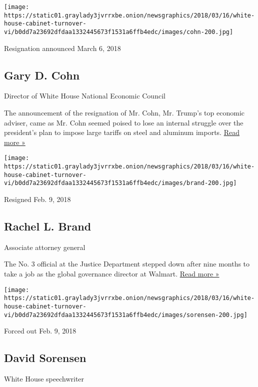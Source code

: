 \texttt{[image: https://static01.graylady3jvrrxbe.onion/newsgraphics/2018/03/16/white-house-cabinet-turnover-vi/b0dd7a23692dfdaa1332445673f1531a6ffb4edc/images/cohn-200.jpg]}

Resignation announced March 6, 2018

\hypertarget{gary-d-cohn}{%
\subsection{Gary D. Cohn}\label{gary-d-cohn}}

Director of White House National Economic Council

The announcement of the resignation of Mr. Cohn, Mr. Trump's top
economic adviser, came as Mr. Cohn seemed poised to lose an internal
struggle over the president's plan to impose large tariffs on steel and
aluminum imports.
\href{https://www.nytimes3xbfgragh.onion/2018/03/12/business/larry-kudlow-favorite-replace-gary-cohn.html}{Read
more »}

\texttt{[image: https://static01.graylady3jvrrxbe.onion/newsgraphics/2018/03/16/white-house-cabinet-turnover-vi/b0dd7a23692dfdaa1332445673f1531a6ffb4edc/images/brand-200.jpg]}

Resigned Feb. 9, 2018

\hypertarget{rachel-l-brand}{%
\subsection{Rachel L. Brand}\label{rachel-l-brand}}

Associate attorney general

The No. 3 official at the Justice Department stepped down after nine
months to take a job as the global governance director at Walmart.
\href{https://www.nytimes3xbfgragh.onion/2018/02/09/us/politics/rachel-brand-justice-department.html}{Read
more »}

\texttt{[image: https://static01.graylady3jvrrxbe.onion/newsgraphics/2018/03/16/white-house-cabinet-turnover-vi/b0dd7a23692dfdaa1332445673f1531a6ffb4edc/images/sorensen-200.jpg]}

Forced out Feb. 9, 2018

\hypertarget{david-sorensen}{%
\subsection{David Sorensen}\label{david-sorensen}}

White House speechwriter

